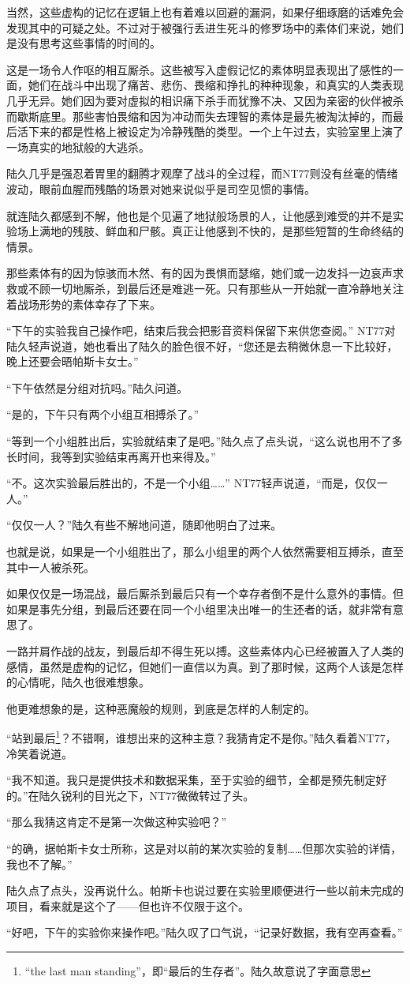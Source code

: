 当然，这些虚构的记忆在逻辑上也有着难以回避的漏洞，如果仔细琢磨的话难免会发现其中的可疑之处。不过对于被强行丢进生死斗的修罗场中的素体们来说，她们是没有思考这些事情的时间的。

这是一场令人作呕的相互厮杀。这些被写入虚假记忆的素体明显表现出了感性的一面，她们在战斗中出现了痛苦、悲伤、畏缩和挣扎的种种现象，和真实的人类表现几乎无异。她们因为要对虚拟的相识痛下杀手而犹豫不决、又因为亲密的伙伴被杀而歇斯底里。那些害怕畏缩和因为冲动而失去理智的素体是最先被淘汰掉的，而最后活下来的都是性格上被设定为冷静残酷的类型。一个上午过去，实验室里上演了一场真实的地狱般的大逃杀。

陆久几乎是强忍着胃里的翻腾才观摩了战斗的全过程，而NT77则没有丝毫的情绪波动，眼前血腥而残酷的场景对她来说似乎是司空见惯的事情。

就连陆久都感到不解，他也是个见遍了地狱般场景的人，让他感到难受的并不是实验场上满地的残肢、鲜血和尸骸。真正让他感到不快的，是那些短暂的生命终结的情景。

那些素体有的因为惊骇而木然、有的因为畏惧而瑟缩，她们或一边发抖一边哀声求救或不顾一切地厮杀，到最后还是难逃一死。只有那些从一开始就一直冷静地关注着战场形势的素体幸存了下来。

“下午的实验我自己操作吧，结束后我会把影音资料保留下来供您查阅。” NT77对陆久轻声说道，她也看出了陆久的脸色很不好，“您还是去稍微休息一下比较好，晚上还要会晤帕斯卡女士。”

“下午依然是分组对抗吗。”陆久问道。

“是的，下午只有两个小组互相搏杀了。”

“等到一个小组胜出后，实验就结束了是吧。”陆久点了点头说，“这么说也用不了多长时间，我等到实验结束再离开也来得及。”

“不。这次实验最后胜出的，不是一个小组……” NT77轻声说道，“而是，仅仅一人。”

“仅仅一人？”陆久有些不解地问道，随即他明白了过来。

也就是说，如果是一个小组胜出了，那么小组里的两个人依然需要相互搏杀，直至其中一人被杀死。

如果仅仅是一场混战，最后厮杀到最后只有一个幸存者倒不是什么意外的事情。但如果是事先分组，到最后还要在同一个小组里决出唯一的生还者的话，就非常有意思了。

一路并肩作战的战友，到最后却不得生死以搏。这些素体内心已经被置入了人类的感情，虽然是虚构的记忆，但她们一直信以为真。到了那时候，这两个人该是怎样的心情呢，陆久也很难想象。

他更难想象的是，这种恶魔般的规则，到底是怎样的人制定的。

“站到最后\footnote{“the last man standing”，即“最后的生存者”。陆久故意说了字面意思}？不错啊，谁想出来的这种主意？我猜肯定不是你。”陆久看着NT77，冷笑着说道。

“我不知道。我只是提供技术和数据采集，至于实验的细节，全都是预先制定好的。”在陆久锐利的目光之下，NT77微微转过了头。

“那么我猜这肯定不是第一次做这种实验吧？”

“的确，据帕斯卡女士所称，这是对以前的某次实验的复制……但那次实验的详情，我也不了解。”

陆久点了点头，没再说什么。帕斯卡也说过要在实验里顺便进行一些以前未完成的项目，看来就是这个了——但也许不仅限于这个。

“好吧，下午的实验你来操作吧。”陆久叹了口气说，“记录好数据，我有空再查看。”